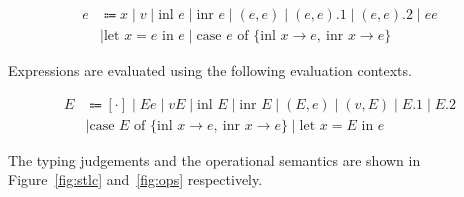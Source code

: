 \documentclass[nonacm]{acmart}
\newcommand{\caseofnobar}[3]{\text{case } #1 \text{ of } \{#2,~#3\}}
\newcommand{\inl}[1]{\text{inl } #1}
\newcommand{\inr}[1]{\text{inr } #1}
\begin{document}
\vspace*{-2em}
\begin{align*}
  e & \Coloneqq x \mid v \mid \inl{e} \mid \inr{e} \mid (e, e) \mid (e, e).1 \mid (e, e).2 \mid e e           \\
    & \mid \text{let } x = e \text{ in } e \mid \caseofnobar{e}{\inl{x} \rightarrow e}{\inr{x} \rightarrow e}
\end{align*}

Expressions are evaluated using the following evaluation contexts.

\vspace*{-2em}
\begin{align*}
  E & \Coloneqq [\cdot] \mid E e \mid v E \mid \inl{E} \mid \inr{E} \mid (E,e) \mid (v, E) \mid E.1 \mid E.2  \\
    & \mid \caseofnobar{E}{\inl{x} \rightarrow e}{\inr{x} \rightarrow e} \mid \text{let } x = E \text{ in } e
\end{align*}

The typing judgements and the operational semantics are shown in Figure~\ref{fig:stlc}
and~\ref{fig:ops} respectively.

\end{document}
